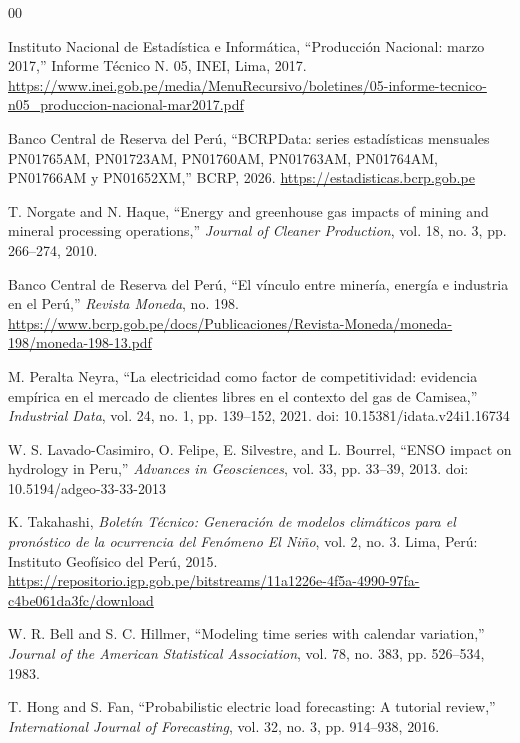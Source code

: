 \documentclass[conference]{IEEEtran}
\begin{document}
\begin{thebibliography}{00}

Instituto Nacional de Estadística e Informática, ``Producción Nacional: marzo 2017,'' Informe Técnico N.\textdegree{} 05, INEI, Lima, 2017. \url{https://www.inei.gob.pe/media/MenuRecursivo/boletines/05-informe-tecnico-n05_produccion-nacional-mar2017.pdf}

Banco Central de Reserva del Perú, ``BCRPData: series estadísticas mensuales PN01765AM, PN01723AM, PN01760AM, PN01763AM, PN01764AM, PN01766AM y PN01652XM,'' BCRP, 2026. \url{https://estadisticas.bcrp.gob.pe}

T. Norgate and N. Haque, ``Energy and greenhouse gas impacts of mining and mineral processing operations,'' \textit{Journal of Cleaner Production}, vol. 18, no. 3, pp. 266--274, 2010.

Banco Central de Reserva del Perú, ``El vínculo entre minería, energía e industria en el Perú,'' \textit{Revista Moneda}, no. 198. \url{https://www.bcrp.gob.pe/docs/Publicaciones/Revista-Moneda/moneda-198/moneda-198-13.pdf}

M. Peralta Neyra, ``La electricidad como factor de competitividad: evidencia empírica en el mercado de clientes libres en el contexto del gas de Camisea,'' \textit{Industrial Data}, vol. 24, no. 1, pp. 139--152, 2021. doi: 10.15381/idata.v24i1.16734

W. S. Lavado-Casimiro, O. Felipe, E. Silvestre, and L. Bourrel, ``ENSO impact on hydrology in Peru,'' \textit{Advances in Geosciences}, vol. 33, pp. 33--39, 2013. doi: 10.5194/adgeo-33-33-2013

K. Takahashi, \textit{Boletín Técnico: Generación de modelos climáticos para el pronóstico de la ocurrencia del Fenómeno El Niño}, vol. 2, no. 3. Lima, Perú: Instituto Geofísico del Perú, 2015. \url{https://repositorio.igp.gob.pe/bitstreams/11a1226e-4f5a-4990-97fa-c4be061da3fc/download}

W. R. Bell and S. C. Hillmer, ``Modeling time series with calendar variation,'' \textit{Journal of the American Statistical Association}, vol. 78, no. 383, pp. 526--534, 1983.

T. Hong and S. Fan, ``Probabilistic electric load forecasting: A tutorial review,'' \textit{International Journal of Forecasting}, vol. 32, no. 3, pp. 914--938, 2016.


\end{thebibliography}
\end{document}
